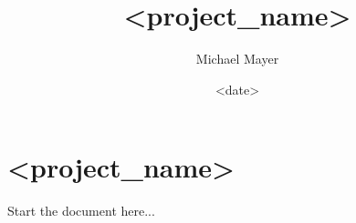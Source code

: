\documentclass{article}
\title{<project_name>}
\date{<date>}
\author{Michael Mayer}
\begin{document}
    

    \maketitle

    \newpage


    \tableofcontents

    \newpage

    \section{<project_name>}

    Start the document here...


    \newpage
    \begin{appendix}
        
        
        \listoffigures
        \listoftables
    \end{appendix}
\end{document}
